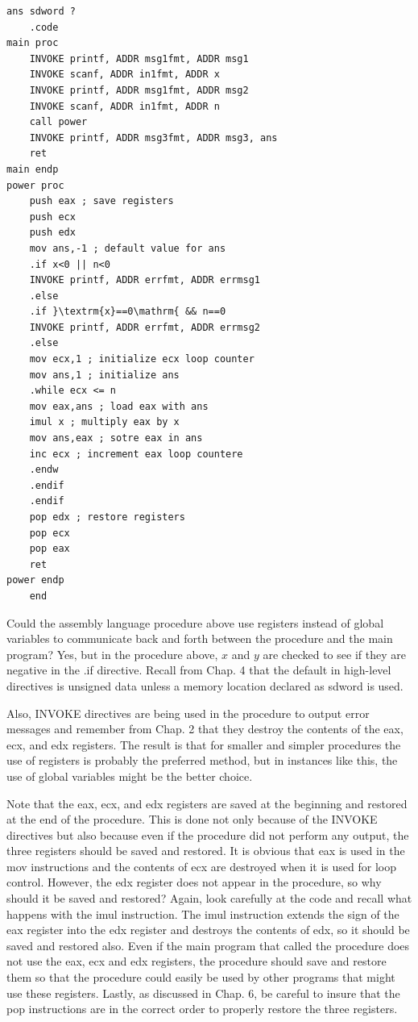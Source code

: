 \documentclass[10pt]{book}
\begin{document}
\begin{center}
\begin{center}
\begin{verbatim}
ans sdword ?
    .code
main proc
    INVOKE printf, ADDR msg1fmt, ADDR msg1
    INVOKE scanf, ADDR in1fmt, ADDR x
    INVOKE printf, ADDR msg1fmt, ADDR msg2
    INVOKE scanf, ADDR in1fmt, ADDR n
    call power
    INVOKE printf, ADDR msg3fmt, ADDR msg3, ans
    ret
main endp
power proc
    push eax ; save registers
    push ecx
    push edx
    mov ans,-1 ; default value for ans
    .if x<0 || n<0
    INVOKE printf, ADDR errfmt, ADDR errmsg1
    .else
    .if }\textrm{x}==0\mathrm{ && n==0
    INVOKE printf, ADDR errfmt, ADDR errmsg2
    .else
    mov ecx,1 ; initialize ecx loop counter
    mov ans,1 ; initialize ans
    .while ecx <= n
    mov eax,ans ; load eax with ans
    imul x ; multiply eax by x
    mov ans,eax ; sotre eax in ans
    inc ecx ; increment eax loop countere
    .endw
    .endif
    .endif
    pop edx ; restore registers
    pop ecx
    pop eax
    ret
power endp
    end
\end{verbatim}

Could the assembly language procedure above use registers instead of global variables to communicate back and forth between the procedure and the main program? Yes, but in the procedure above, $x$ and $y$ are checked to see if they are negative in the .if directive. Recall from Chap. 4 that the default in high-level directives is unsigned data unless a memory location declared as sdword is used.

Also, INVOKE directives are being used in the procedure to output error messages and remember from Chap. 2 that they destroy the contents of the eax, ecx, and edx registers. The result is that for smaller and simpler procedures the use of registers is probably the preferred method, but in instances like this, the use of global variables might be the better choice.

Note that the eax, ecx, and edx registers are saved at the beginning and restored at the end of the procedure. This is done not only because of the INVOKE directives but also because even if the procedure did not perform any output, the three registers should be saved and restored. It is obvious that eax is used in the mov instructions and the contents of ecx are destroyed when it is used for loop control. However, the edx register does not appear in the procedure, so why should it be saved and restored? Again, look carefully at the code and recall what happens with the imul instruction. The imul instruction extends the sign of the eax register into the edx register and destroys the contents of edx, so it should be saved and restored also. Even if the main program that called the procedure does not use the eax, ecx and edx registers, the procedure should save and restore them so that the procedure could easily be used by other programs that might use these registers. Lastly, as discussed in Chap. 6, be careful to insure that the pop instructions are in the correct order to properly restore the three registers.


\end{center}
\end{center}
\end{document}

